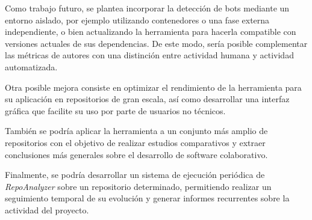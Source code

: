 \documentclass[a4paper, 12pt]{book}
\begin{document}
Como trabajo futuro, se plantea incorporar la detección de bots mediante un entorno aislado, por ejemplo utilizando contenedores o una fase externa independiente, o bien actualizando la herramienta para hacerla compatible con versiones actuales de sus dependencias. De este modo, sería posible complementar las métricas de autores con una distinción entre actividad humana y actividad automatizada.

Otra posible mejora consiste en optimizar el rendimiento de la herramienta para su aplicación en repositorios de gran escala, así como desarrollar una interfaz gráfica que facilite su uso por parte de usuarios no técnicos.

También se podría aplicar la herramienta a un conjunto más amplio de repositorios con el objetivo de realizar estudios comparativos y extraer conclusiones más generales sobre el desarrollo de software colaborativo.

Finalmente, se podría desarrollar un sistema de ejecución periódica de \emph{RepoAnalyzer} sobre un repositorio determinado, permitiendo realizar un seguimiento temporal de su evolución y generar informes recurrentes sobre la actividad del proyecto.



\cleardoublepage


\end{document}
